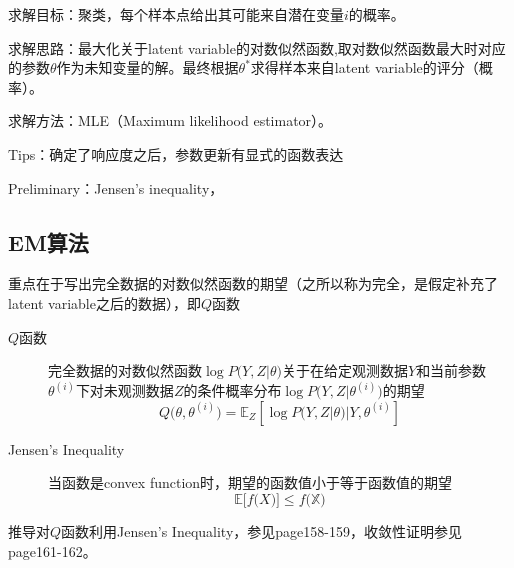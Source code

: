 \documentclass{ctexart}
\begin{document}
求解目标：聚类，每个样本点给出其可能来自潜在变量$i$的概率。

求解思路：最大化关于latent variable的对数似然函数,取对数似然函数最大时对应的参数$\theta$作为未知变量的解。最终根据$\theta^*$求得样本来自latent variable的评分（概率）。

求解方法：MLE（Maximum likelihood estimator）。

Tips：确定了响应度之后，参数更新有显式的函数表达

Preliminary：Jensen's inequality，



\subsection{EM算法}
\label{derivations}
重点在于写出完全数据的对数似然函数的期望（之所以称为完全，是假定补充了latent variable之后的数据），即$Q$函数
\begin{description}
\item[$Q$函数\cite{LiHang:Statistic}]
完全数据的对数似然函数$\log P\big(Y,Z|\theta\big)$关于在给定观测数据$Y$和当前参数$\theta^{\left(i\right)}$下对未观测数据$Z$的条件概率分布$\log P\big(Y,Z|\theta^{\left(i\right)}\big)$的期望
\begin{equation}
Q\big(\theta,\theta^{\left(i\right)}\big)=\mathbb{E}_Z\left[\log P\big(Y,Z|\theta\big)|Y, \theta^{\left(i\right)}\right]
\end{equation}

\item[Jensen's Inequality]
当函数是convex function时，期望的函数值小于等于函数值的期望
\begin{equation}
\mathbb{E}\big[f\big(X\big)\big]\leq f\big(\mathbb X\big)
\end{equation}
\end{description}
推导对$Q$函数利用Jensen's Inequality，参见page158-159\cite{LiHang:Statistic}，收敛性证明参见page161-162\cite{LiHang:Statistic}。
\end{document}
